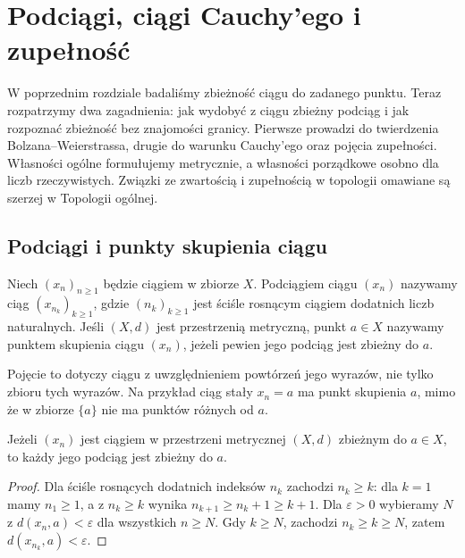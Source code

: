 \chapter{Podciągi, ciągi Cauchy'ego i zupełność}
\label{ma1:ch:cauchy-completeness}

W poprzednim rozdziale badaliśmy zbieżność ciągu do zadanego punktu. Teraz rozpatrzymy dwa zagadnienia: jak wydobyć z ciągu zbieżny podciąg i jak rozpoznać zbieżność bez znajomości granicy. Pierwsze prowadzi do twierdzenia Bolzana--Weierstrassa, drugie do warunku Cauchy'ego oraz pojęcia zupełności. Własności ogólne formułujemy metrycznie, a własności porządkowe osobno dla liczb rzeczywistych. Związki ze zwartością i zupełnością w topologii omawiane są szerzej w Topologii ogólnej.

\section{Podciągi i punkty skupienia ciągu}
\begin{definicja}
\label{ma1:def:subsequence}
Niech $(x_n)_{n\ge1}$ będzie ciągiem w zbiorze $X$. Podciągiem ciągu $(x_n)$ nazywamy ciąg $(x_{n_k})_{k\ge1}$, gdzie $(n_k)_{k\ge1}$ jest ściśle rosnącym ciągiem dodatnich liczb naturalnych. Jeśli $(X,d)$ jest przestrzenią metryczną, punkt $a\in X$ nazywamy punktem skupienia ciągu $(x_n)$, jeżeli pewien jego podciąg jest zbieżny do $a$.
\end{definicja}
Pojęcie to dotyczy ciągu z uwzględnieniem powtórzeń jego wyrazów, nie tylko zbioru tych wyrazów. Na przykład ciąg stały $x_n=a$ ma punkt skupienia $a$, mimo że w zbiorze $\{a\}$ nie ma punktów różnych od $a$.

\begin{lemat}
\label{ma1:lem:subsequence-limit}
Jeżeli $(x_n)$ jest ciągiem w przestrzeni metrycznej $(X,d)$ zbieżnym do $a\in X$, to każdy jego podciąg jest zbieżny do $a$.
\end{lemat}
\begin{proof}
Dla ściśle rosnących dodatnich indeksów $n_k$ zachodzi $n_k\ge k$: dla $k=1$ mamy $n_1\ge1$, a z $n_k\ge k$ wynika $n_{k+1}\ge n_k+1\ge k+1$. Dla $\varepsilon>0$ wybieramy $N$ z $d(x_n,a)<\varepsilon$ dla wszystkich $n\ge N$. Gdy $k\ge N$, zachodzi $n_k\ge k\ge N$, zatem $d(x_{n_k},a)<\varepsilon$.
\end{proof}


